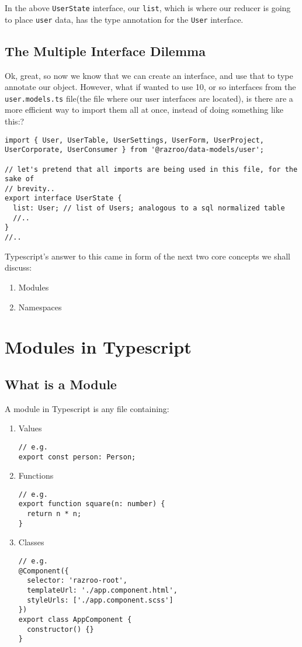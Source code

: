 In the above \lstinline{UserState} interface, our \lstinline{list}, which is where our reducer is going to place \lstinline{user} data, has the type annotation for the \lstinline{User} interface.

\subsection{The Multiple Interface Dilemma}
Ok, great, so now we know that we can create an interface, and use that to type annotate our object. However, what if wanted to use 10, or so interfaces from the \lstinline{user.models.ts} file(the file where our user interfaces are located), is there are a more efficient way to import them all at once, instead of doing something like this:? 

\begin{lstlisting}[caption=user.reducer.ts]
import { User, UserTable, UserSettings, UserForm, UserProject, UserCorporate, UserConsumer } from '@razroo/data-models/user';

// let's pretend that all imports are being used in this file, for the sake of
// brevity.. 
export interface UserState {
  list: User; // list of Users; analogous to a sql normalized table
  //..
}  
//..
\end{lstlisting}

Typescript's answer to this came in form of the next two core concepts we shall discuss:
\begin{enumerate}
  \item Modules
  \item Namespaces
\end{enumerate}

\section{Modules in Typescript}

\subsection{What is a Module}
A module in Typescript is any file containing: 
\begin{enumerate}
  \item Values 
\begin{verbatim}
// e.g.  
export const person: Person;  
\end{verbatim}  
\item Functions
\begin{verbatim}
// e.g. 
export function square(n: number) {
  return n * n;
}
\end{verbatim}
\item Classes
\begin{verbatim}
// e.g.
@Component({
  selector: 'razroo-root',
  templateUrl: './app.component.html',
  styleUrls: ['./app.component.scss']
})
export class AppComponent {
  constructor() {}
}
\end{verbatim}
\end{enumerate}

